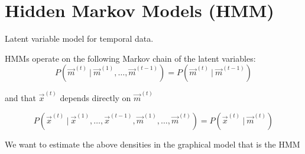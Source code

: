 \section{Hidden Markov Models (HMM)}

\begin{frame} 
    \begin{center}
    Latent variable model for temporal data.
    \end{center}
	
\end{frame}

\begin{frame}{\secname}

HMMs operate on the following Markov chain of the latent variables:
\begin{equation}
P(\vec{m}^{(t)}  ~|~ \vec{m}^{(1)},  \dots,\vec{m}^{(t-1)}) =
		P(\vec{m}^{(t)}  ~|~ \vec{m}^{(t-1)})
\end{equation}

and that $\vec x^{(t)}$ depends directly on $\vec m^{(t)}$

\begin{equation}
P(\vec{x}^{(t)}  ~|~ \vec{x}^{(1)},  \dots,\vec{x}^{(t-1)}, \vec{m}^{(1)},  \dots,\vec{m}^{(t)}) =
		P(\vec{x}^{(t)}  ~|~ \vec{m}^{(t)})
\end{equation}

We want to estimate the above densities in the graphical model that is the HMM

\end{frame}

